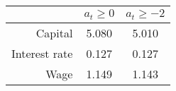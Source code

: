 \begin{center}
 \begin{tabular}{r c c}
 & $a_t\geq0$ & $a_t\geq-2$ \\ \hline Capital &  5.080  &  5.010  \\Interest rate &  0.127  &  0.127  \\Wage &  1.149  &  1.143 \\ \hline\end{tabular}
 \end{center}